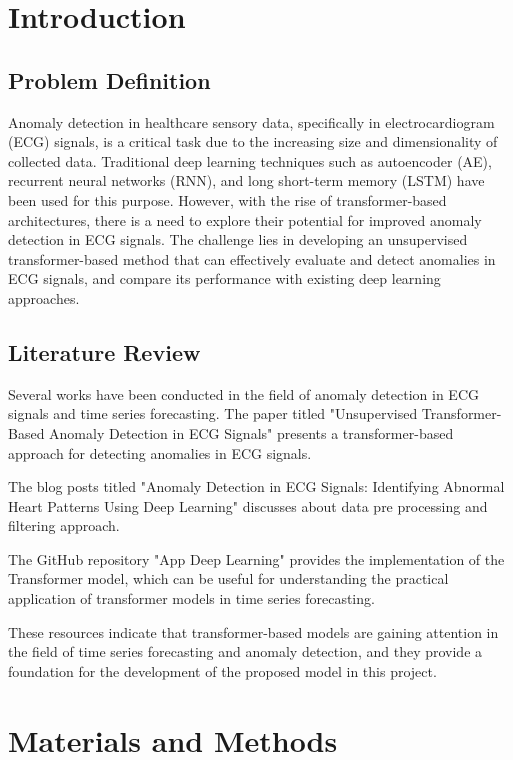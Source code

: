 
\section{Introduction}
\subsection{Problem Definition}
Anomaly detection in healthcare sensory data, specifically in electrocardiogram (ECG) signals, is a critical task due to the increasing size and dimensionality of collected data. Traditional deep learning techniques such as autoencoder (AE), recurrent neural networks (RNN), and long short-term memory (LSTM) have been used for this purpose. However, with the rise of transformer-based architectures, there is a need to explore their potential for improved anomaly detection in ECG signals. The challenge lies in developing an unsupervised transformer-based method that can effectively evaluate and detect anomalies in ECG signals, and compare its performance with existing deep learning approaches.


\subsection{Literature Review}
Several works have been conducted in the field of anomaly detection in ECG signals and time series forecasting. 
The paper titled "Unsupervised Transformer-Based Anomaly Detection in ECG Signals" \cite{a16030152} presents a transformer-based approach for detecting anomalies in ECG signals. 

The blog posts titled "Anomaly Detection in ECG Signals: Identifying Abnormal Heart Patterns Using Deep Learning" \cite{anomaly_detection} discusses about data pre processing and filtering approach. 

The GitHub repository "App Deep Learning" \cite{transformer_model_arch} provides the implementation of the Transformer model, which can be useful for understanding the practical application of transformer models in time series forecasting.


These resources indicate that transformer-based models are gaining attention in the field of time series forecasting and anomaly detection, and they provide a foundation for the development of the proposed model in this project.

\section{Materials and Methods}

